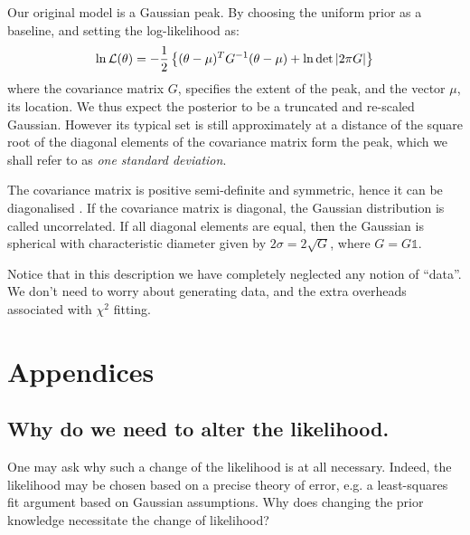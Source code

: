\documentclass[usenatbib]{mnras}
\begin{document}
Our original model is a Gaussian peak. By choosing the uniform prior as a baseline, and setting the log-likelihood as:
\begin{equation}
  \ln {\cal L}(\theta) = - \frac{1}{2} \left\{(\theta - \mu)^{T}G^{-1}(\theta-\mu)  + \ln \det \left| 2\pi G\right| \right\}
\end{equation}
where the covariance matrix \(G\), specifies the extent of the peak,
and the vector \(\mu\), its location. We thus expect the posterior to
be a truncated and re-scaled Gaussian. However its typical set is
still approximately at a distance of the square root of the diagonal elements of the
covariance matrix form the peak, which we shall refer to as \emph{one
standard deviation}.

The covariance matrix is positive semi-definite and symmetric,
hence it can be diagonalised \citep{taboga2017lectures}. If the covariance matrix is diagonal,
the Gaussian distribution is called uncorrelated. If all diagonal
elements are equal, then the Gaussian is spherical with
characteristic diameter given by \(2 \sigma = 2\sqrt{G}\), where \(G = G
   \mathbb{1}\).

Notice that in this description we have completely neglected any
notion of ``data''. We don't need to worry about generating data,
and the extra overheads associated with \(\chi^2\) fitting.


\section{Appendices}
\label{sec:org6c430b6}

\subsection{Why do we need to alter the likelihood. \label{sec:repart-necessity}}
\label{sec:org1ee1d39}
One may ask why such a change of the likelihood is at all
necessary. Indeed, the likelihood may be chosen based on a precise
theory of error, e.g. a least-squares fit argument based on
Gaussian assumptions. Why does changing the prior knowledge
necessitate the change of likelihood?
\end{document}
